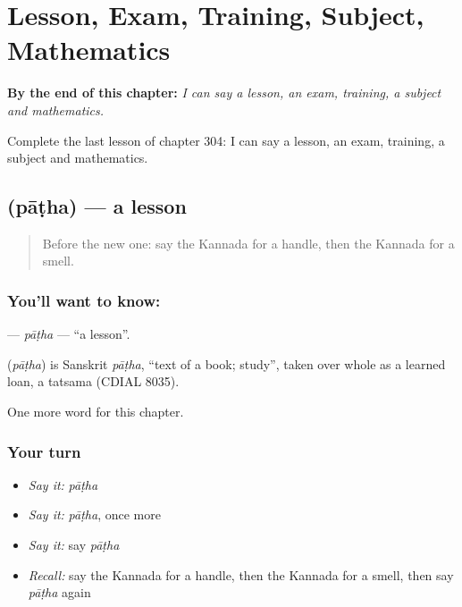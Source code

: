 
\chapter{Lesson, Exam, Training, Subject, Mathematics}
\label{ch:ka-lesson-exam-training-subject-mathematics}

\begin{chapteropening}
\textbf{By the end of this chapter:} \emph{I can say a lesson, an exam, training, a subject and mathematics.}

Complete the last lesson of chapter 304: I can say a lesson, an exam, training, a subject and mathematics.
\end{chapteropening}

\section[\texorpdfstring{\kn{ಪಾಠ} (pāṭha)}{ಪಾಠ (pāṭha)}]{ (pāṭha) — a lesson}

\label{lesson:KA-C304-patha}



\begin{quote}
Before the new one: say the Kannada for a handle, then the Kannada for a smell.
\end{quote}

\subsection*{You'll want to know: }
\textbf{} — \emph{pāṭha} — \textquotedblleft{}a lesson\textquotedblright{}.

\begin{cousinweb}
\textbf{} (\emph{pāṭha}) is Sanskrit \emph{pāṭha}, \textquotedblleft{}text of a book; study\textquotedblright{}, taken over whole as a learned loan, a tatsama (CDIAL 8035).
\end{cousinweb}

\begin{grammarlens}[title={What you've built}]
One more word for this chapter.
\end{grammarlens}

\subsection*{Your turn}
\begin{itemize}
\raggedright
  \item \emph{Say it:} \emph{pāṭha}
  \item \emph{Say it:} \emph{pāṭha}, once more
  \item \emph{Say it:} say \emph{pāṭha}
  \item \emph{Recall:} say the Kannada for a handle, then the Kannada for a smell, then say \emph{pāṭha} again
\end{itemize}


